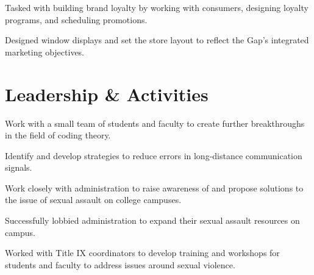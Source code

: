 \documentclass{resume}
\begin{document}
\begin{minipage}[t]{0.66\textwidth}
\begin{tightemize}
\item Tasked with building brand loyalty by working with consumers, designing loyalty programs, and scheduling promotions.
\item Designed window displays and set the store layout to reflect the Gap's integrated marketing objectives. 
\end{tightemize}
\sectionsep

\section{Leadership \& Activities}

\begin{tightemize}
\item Work with a small team of students and faculty to create further breakthroughs in the field of coding theory.
\item Identify and develop strategies to reduce errors in long-distance communication signals.
\end{tightemize}
\sectionsep

\begin{tightemize}
\item Work closely with administration to raise awareness of and propose solutions to the issue of sexual assault on college campuses.
\item Successfully lobbied administration to expand their sexual assault resources on campus.
\item Worked with Title IX coordinators to develop training and workshops for students and faculty to address issues around sexual violence.
\end{tightemize}
\sectionsep



\end{minipage}
\end{document}
